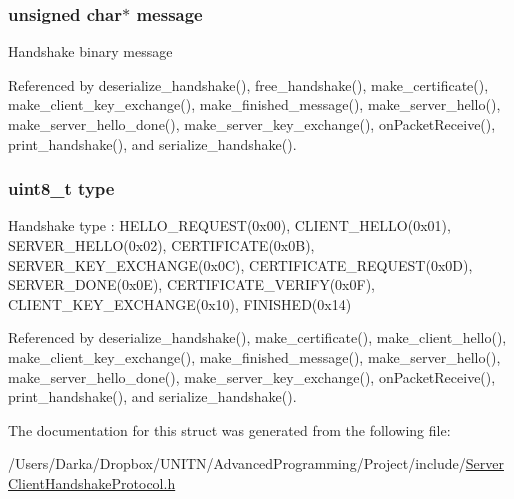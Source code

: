\subsubsection[{\texorpdfstring{message}{message}}]{\setlength{\rightskip}{0pt plus 5cm}unsigned char$\ast$ message}\hypertarget{structhandshake__t_abb13456032cf48eaa794391b6ed937c7}{}\label{structhandshake__t_abb13456032cf48eaa794391b6ed937c7}
Handshake binary message 

Referenced by deserialize\+\_\+handshake(), free\+\_\+handshake(), make\+\_\+certificate(), make\+\_\+client\+\_\+key\+\_\+exchange(), make\+\_\+finished\+\_\+message(), make\+\_\+server\+\_\+hello(), make\+\_\+server\+\_\+hello\+\_\+done(), make\+\_\+server\+\_\+key\+\_\+exchange(), on\+Packet\+Receive(), print\+\_\+handshake(), and serialize\+\_\+handshake().

\subsubsection[{\texorpdfstring{type}{type}}]{\setlength{\rightskip}{0pt plus 5cm}uint8\+\_\+t type}\hypertarget{structhandshake__t_a1d127017fb298b889f4ba24752d08b8e}{}\label{structhandshake__t_a1d127017fb298b889f4ba24752d08b8e}
Handshake type \+: H\+E\+L\+L\+O\+\_\+\+R\+E\+Q\+U\+E\+S\+T(0x00), C\+L\+I\+E\+N\+T\+\_\+\+H\+E\+L\+L\+O(0x01), S\+E\+R\+V\+E\+R\+\_\+\+H\+E\+L\+L\+O(0x02), C\+E\+R\+T\+I\+F\+I\+C\+A\+T\+E(0x0\+B), S\+E\+R\+V\+E\+R\+\_\+\+K\+E\+Y\+\_\+\+E\+X\+C\+H\+A\+N\+G\+E(0x0\+C), C\+E\+R\+T\+I\+F\+I\+C\+A\+T\+E\+\_\+\+R\+E\+Q\+U\+E\+S\+T(0x0\+D), S\+E\+R\+V\+E\+R\+\_\+\+D\+O\+N\+E(0x0\+E), C\+E\+R\+T\+I\+F\+I\+C\+A\+T\+E\+\_\+\+V\+E\+R\+I\+F\+Y(0x0\+F), C\+L\+I\+E\+N\+T\+\_\+\+K\+E\+Y\+\_\+\+E\+X\+C\+H\+A\+N\+G\+E(0x10), F\+I\+N\+I\+S\+H\+E\+D(0x14) 

Referenced by deserialize\+\_\+handshake(), make\+\_\+certificate(), make\+\_\+client\+\_\+hello(), make\+\_\+client\+\_\+key\+\_\+exchange(), make\+\_\+finished\+\_\+message(), make\+\_\+server\+\_\+hello(), make\+\_\+server\+\_\+hello\+\_\+done(), make\+\_\+server\+\_\+key\+\_\+exchange(), on\+Packet\+Receive(), print\+\_\+handshake(), and serialize\+\_\+handshake().



The documentation for this struct was generated from the following file\+:\begin{DoxyCompactItemize}
\item 
/\+Users/\+Darka/\+Dropbox/\+U\+N\+I\+T\+N/\+Advanced\+Programming/\+Project/include/\hyperlink{_server_client_handshake_protocol_8h}{Server\+Client\+Handshake\+Protocol.\+h}\end{DoxyCompactItemize}
